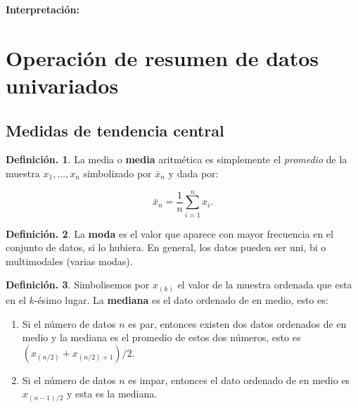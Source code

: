 \documentclass[]{book}
\theoremstyle{definition}
\newtheorem{definition}{Definición.}[chapter]
\theoremstyle{definition}
\theoremstyle{definition}
\theoremstyle{remark}
\begin{document}
\textbf{Interpretación:}

\hypertarget{operaciuxf3n-de-resumen-de-datos-univariados}{%
\section{Operación de resumen de datos univariados}\label{operaciuxf3n-de-resumen-de-datos-univariados}}

\hypertarget{medidas-de-tendencia-central}{%
\subsection{Medidas de tendencia central}\label{medidas-de-tendencia-central}}

\begin{definition}
\protect\hypertarget{def:unnamed-chunk-54}{}{\label{def:unnamed-chunk-54} }La media o \textbf{media} aritmética es simplemente el
\emph{promedio} de la muestra
\(x_1, \ldots , x_n\) simbolizado por \(\bar{x}_n\) y dada
por:

\[\bar{x}_n = \frac{1}{n} \sum_{i=1}^n x_i . \]
\end{definition}

\begin{definition}
\protect\hypertarget{def:unnamed-chunk-55}{}{\label{def:unnamed-chunk-55} }
La \textbf{moda} es el valor que aparece con mayor frecuencia
en el conjunto de
datos, si lo hubiera. En general, los datos pueden ser
uni, bi o multimodales (varias modas).
\end{definition}

\begin{definition}
\protect\hypertarget{def:unnamed-chunk-56}{}{\label{def:unnamed-chunk-56} }
Simbolisemos por \(x_{(k)}\) el valor de la muestra
ordenada que esta en el \(k\)-ésimo lugar. La
\textbf{mediana} es el dato ordenado de en medio, esto es:

\begin{enumerate}
\def\labelenumi{(\alph{enumi})}
\item
  Si el número de datos \(n\) es par, entonces existen
  dos datos ordenados de en medio y la
  mediana es el promedio de estos dos números, esto es
  \((x_{(n/2)} + x_{(n/2)+1})/2\).
\item
  Si el número de datos \(n\) es impar, entonces el dato
  ordenado de en medio es \(x_{(n-1)/2}\) y
  esta es la mediana.
\end{enumerate}
\end{definition}
\end{document}
